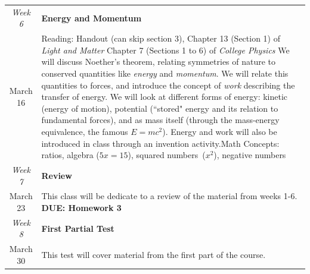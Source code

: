 \documentclass[12pt]{article}
\begin{document}
\noindent \begin{tabularx}{\textwidth}[c]{| c X |}
\hline
	\textit{Week 6} & \textbf{Energy and Momentum} \\ March 16 & Reading: Handout (can skip section 3), Chapter 13 (Section 1) of \textit{Light and Matter} Chapter 7 (Sections 1 to 6) of \textit{College Physics} \newline We will discuss Noether's theorem, relating symmetries of nature to conserved quantities like \textit{energy} and \textit{momentum}. We will relate this quantities to forces, and introduce the concept of \textit{work} describing the transfer of energy. We will look at different forms of energy: kinetic (energy of motion), potential (``stored" energy and its relation to fundamental forces), and as mass itself (through the mass-energy equivalence, the famous $E=mc^2$). Energy and work will also be introduced in class through an invention activity.\newline Math Concepts: ratios, algebra ($5x = 15$), squared numbers~($x^2$), negative numbers\\ \hline
	\textit{Week 7} & \textbf{Review} \\ March 23 & This class will be dedicate to a review of the material from weeks 1-6. \newline \textbf{DUE: Homework 3}\\ \hline
	\textit{Week 8} & \textbf{First Partial Test} \\ March 30 & This test will cover material from the first part of the course.\\ \hline
	\end{tabularx}
\vspace{0.1in}
\end{document}
